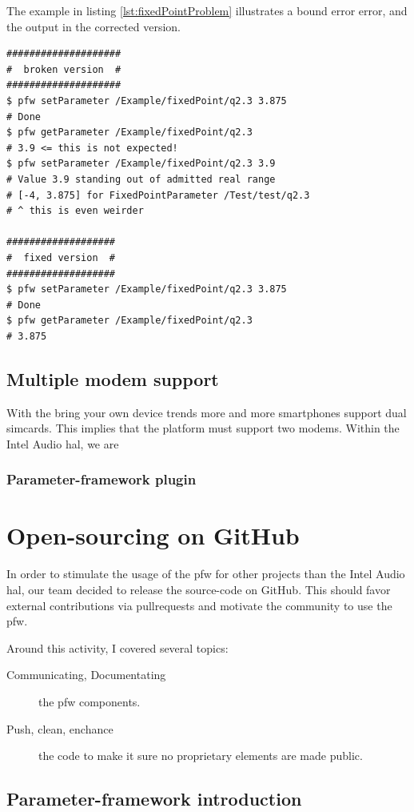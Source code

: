 The example in listing \ref {lst:fixedPointProblem} illustrates a bound error error, and the output in the corrected version.
\begin{lstlisting}[caption=$Q.2.3$ rounding issue example, label=lst:fixedPointProblem]
####################
#  broken version  #
####################
$ pfw setParameter /Example/fixedPoint/q2.3 3.875
# Done
$ pfw getParameter /Example/fixedPoint/q2.3
# 3.9 <= this is not expected!
$ pfw setParameter /Example/fixedPoint/q2.3 3.9
# Value 3.9 standing out of admitted real range
# [-4, 3.875] for FixedPointParameter /Test/test/q2.3
# ^ this is even weirder

###################
#  fixed version  #
###################
$ pfw setParameter /Example/fixedPoint/q2.3 3.875
# Done
$ pfw getParameter /Example/fixedPoint/q2.3
# 3.875
\end{lstlisting}


\subsection{Multiple modem support}
With the bring your own device trends more and more smartphones support dual simcards. This implies that the platform must support two modems.
Within the Intel Audio \gls{hal}, we are

\subsubsection{Parameter-framework plugin}

\section{Open-sourcing on GitHub}
In order to stimulate the usage of the \gls{pfw} for other projects than the Intel Audio \gls{hal},
our team decided to release the source-code on \gls{GitHub}.
This should favor external contributions via \gls{pullrequests} and motivate
the community to use the \gls{pfw}.

Around this activity, I covered several topics:
\begin{description}
    \item[Communicating, Documentating] the \gls{pfw} components.
    \item[Push, clean, enchance] the code to make it sure no proprietary
        elements are made public.
\end{description}

\subsection{Parameter-framework introduction}
